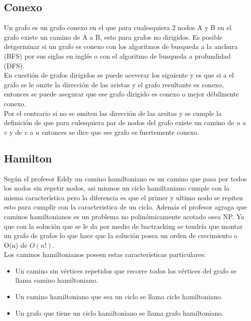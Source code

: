 \documentclass[10pt,a4paper]{article}
\begin{document}
\subsection{Conexo}
	Un grafo es un grafo conexo en el que para cualesquiera 2 nodos A y B en el grafo existe un camino de A a B, esto para grafos no dirigidos. Es posible detgerminar si un grafo es conexo con los algoritmos de busqueda a la anchura (BFS) por sus siglas en inglés o con el algoritmo de busqueda a profundidad (DFS).\\
	
	
	En cuestión de grafos dirigidos se puede aceverar los siguiente y es que si a el grafo se le omite la dirección de las aristas y el grafo resultante es conexo, entonces se puede asegurar que ese grafo dirigido es conexo o mejor débilmente conexo.\\
	
	
	Por el contrario si no se omiten las dirección de las arsitas y se cumple la definición de que para culesquiera par de nodos del grafo existe un camino de $u$ a $v$ y de $v$ a $u$ entonces se dice que ese grafo es fuertemente conexo.\\ 
\subsection{Hamilton}
	Según el profesor Eddy un camino hamiltoniano es un camino que pasa por todos los nodos sin repetir nodos, asi mismos un ciclo hamiltaniano cumple con la misma característica pero la diferencia es que el primer y ultimo nodo se repiten esto para cumplir con la caracteristica de un ciclo. Además el profesor agraga que caminos hamiltonianos es un problema no polinómicamente acotado osea NP. Ya que con la solución que se le da por medio de bactracking se tendría que montar un grafo de grafos lo que hace que la solución posea un orden de crecimiento o O(n) de $O(n!)$.\cite{Hamilton}\\
	
	
	Los caminos hamiltonianos poseen estas características particulares: 
\begin{itemize}
\item	Un camino sin vértices repetidos que recorre todos los vértices del grafo se llama camino hamiltoniano.
\item Un camino hamiltoniano que sea un ciclo se llama ciclo hamiltoniano.
\item Un grafo que tiene un ciclo hamiltoniano se llama grafo hamiltoniano.
\end{itemize}
\end{document}
